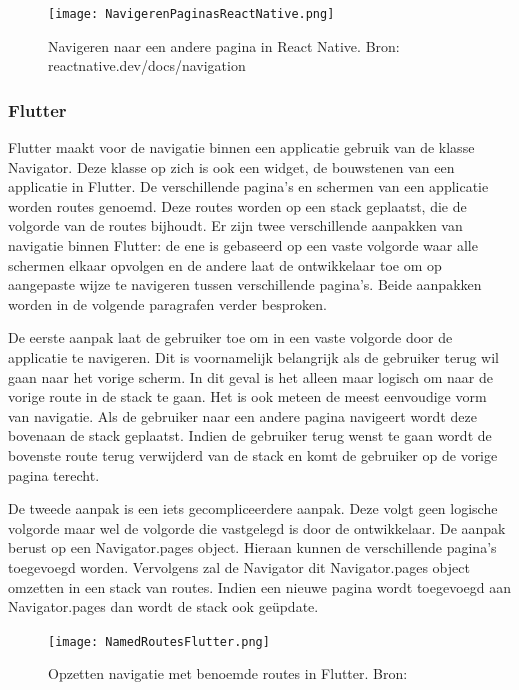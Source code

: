 \begin{figure}
    \texttt{[image: NavigerenPaginasReactNative.png]}
    \caption{Navigeren naar een andere pagina in React Native. Bron:
        reactnative.dev/docs/navigation}
    \label{fig:navigerenReactNative}
\end{figure}

\subsubsection{Flutter}
\label{subsubsec:navigatieFlutter}

Flutter maakt voor de navigatie binnen een applicatie gebruik van de klasse
Navigator. Deze klasse op zich is ook een widget, de bouwstenen van een
applicatie in Flutter. De verschillende pagina's en schermen van een applicatie
worden routes genoemd. Deze routes worden op een stack geplaatst, die de
volgorde van de routes bijhoudt. Er zijn twee verschillende aanpakken van
navigatie binnen Flutter: de ene is gebaseerd op een vaste volgorde waar alle
schermen elkaar opvolgen en de andere laat de ontwikkelaar toe om op aangepaste
wijze te navigeren tussen verschillende pagina's. Beide aanpakken worden in de
volgende paragrafen verder besproken. 

De eerste aanpak laat de gebruiker toe om in een vaste volgorde door de
applicatie te navigeren. Dit is voornamelijk belangrijk als de gebruiker terug
wil gaan naar het vorige scherm. In dit geval is het alleen maar logisch om naar
de vorige route in de stack te gaan. Het is ook meteen de meest eenvoudige vorm
van navigatie. Als de gebruiker naar een andere pagina navigeert wordt deze
bovenaan de stack geplaatst. Indien de gebruiker terug wenst te gaan wordt de
bovenste route terug verwijderd van de stack en komt de gebruiker op de vorige
pagina terecht.

De tweede aanpak is een iets gecompliceerdere aanpak. Deze volgt geen logische
volgorde maar wel de volgorde die vastgelegd is door de ontwikkelaar. De aanpak
berust op een Navigator.pages object. Hieraan kunnen de verschillende pagina's
toegevoegd worden. Vervolgens zal de Navigator dit Navigator.pages object
omzetten in een stack van routes. Indien een nieuwe pagina wordt toegevoegd aan
Navigator.pages dan wordt de stack ook geüpdate. 

\begin{figure}
    \texttt{[image: NamedRoutesFlutter.png]}
    \caption{Opzetten navigatie met benoemde routes in Flutter. Bron:
        \textcite{Flutter.dev2020}}
    \label{fig:namedRoutesFlutter}
\end{figure}

